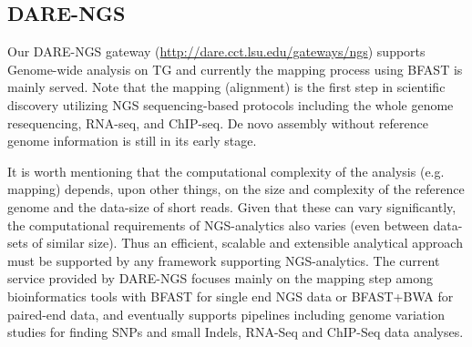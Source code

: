 \documentclass{sig-alternate}
\begin{document}
\subsection{DARE-NGS}
Our DARE-NGS gateway (\url {http://dare.cct.lsu.edu/gateways/ngs}) supports Genome-wide analysis on TG and currently the mapping process using BFAST is mainly served\cite{bfast2009}. Note that the mapping (alignment) is the first step in scientific discovery utilizing NGS sequencing-based protocols including the whole genome resequencing, RNA-seq, and ChIP-seq.  De novo assembly without reference genome information is still in its early stage.  

It is worth mentioning that the computational complexity
of the analysis (e.g. mapping) depends, upon other things, on the size
and complexity of the reference genome and the data-size of short reads.
Given that these can vary significantly, the computational
requirements of NGS-analytics also varies (even between data-sets of
similar size).  Thus an efficient, scalable and extensible analytical
approach must be supported by any framework supporting
NGS-analytics.  The current service provided by DARE-NGS focuses mainly on the mapping step among bioinformatics tools with BFAST for single end NGS data or BFAST+BWA for paired-end data, and eventually supports pipelines including genome variation studies for finding SNPs and small Indels, RNA-Seq and ChIP-Seq data analyses.

\end{document}
